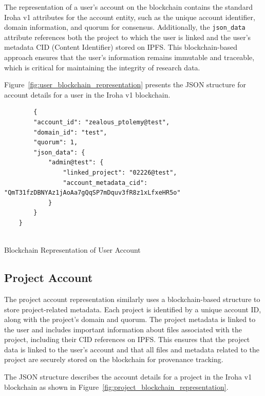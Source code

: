 \documentclass[final]{rc-book-2.14}
\begin{document}
The representation of a user's account on the blockchain contains the standard Iroha v1 attributes for the account entity, such as the unique account identifier, domain information, and quorum for consensus. Additionally, the \texttt{json\_data} attribute references both the project to which the user is linked and the user's metadata CID (Content Identifier) stored on IPFS. This blockchain-based approach ensures that the user’s information remains immutable and traceable, which is critical for maintaining the integrity of research data.

Figure~\ref{fig:user_blockchain_representation} presents the JSON structure for account details for a user in the Iroha v1 blockchain.


\begin{listing}
\begin{verbatim}
        {
        "account_id": "zealous_ptolemy@test",
        "domain_id": "test",
        "quorum": 1,
        "json_data": {
            "admin@test": {
                "linked_project": "02226@test",
                "account_metadata_cid": "QmT31fzDBNYAz1jAoAa7gQqSP7mDquv3fR8z1xLfxeHR5o"
            }
        }
    }
  
\end{verbatim}
\caption{Blockchain Representation of User Account}
\label{fig:user_blockchain_representation}
\end{listing}



\subsection{Project Account}

The project account representation similarly uses a blockchain-based structure to store project-related metadata. Each project is identified by a unique account ID, along with the project’s domain and quorum. The project metadata is linked to the user and includes important information about files associated with the project, including their CID references on IPFS. This ensures that the project data is linked to the user’s account and that all files and metadata related to the project are securely stored on the blockchain for provenance tracking.

The JSON structure describes the account details for a project in the Iroha v1 blockchain as shown in Figure~\ref{fig:project_blockchain_representation}.
\end{document}
